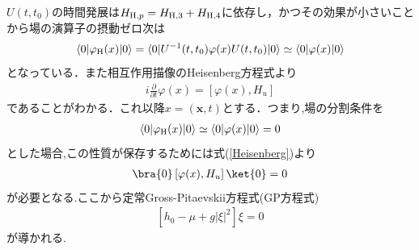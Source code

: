 \documentclass[10.5pt,a4paper]{jreport}
\begin{document}
$U(t,t_0)$の時間発展は$H_{{\rm H},p}=H_{{\rm H},3}+H_{{\rm H},4}$に依存し，かつその効果が小さいことから場の演算子の摂動ゼロ次は
\begin{eqnarray}
  \langle0|\varphi_{\rm H}(x)|0\rangle = \langle0| U^{-1}(t,t_0)\varphi(x)U(t,t_0)|0\rangle \simeq \langle0|\varphi(x)|0\rangle
\end{eqnarray}
となっている．また相互作用描像のHeisenberg方程式より
\begin{eqnarray}
  i\frac{\partial}{\partial t}\varphi(x) = \left[\varphi(x),H_u\right]\label{Heisenberg}
\end{eqnarray}
であることがわかる．これ以降$x=(\bm{x},t)$とする．つまり,場の分割条件を
\begin{eqnarray}
  \langle0|\varphi_{\rm H}(x)|0\rangle \simeq \langle0|\varphi(x)|0\rangle = 0
\end{eqnarray}
とした場合,この性質が保存するためには式(\ref{Heisenberg})より
\begin{eqnarray}
  \bra{0}\left[\varphi(x),H_u\right]\ket{0} = 0
\end{eqnarray}
が必要となる.ここから定常Gross-Pitaevskii方程式(GP方程式)
\begin{eqnarray}
  \left[h_0 - \mu +g|\xi|^2\right]\xi = 0\label{GP}
\end{eqnarray}
が導かれる.
\end{document}
